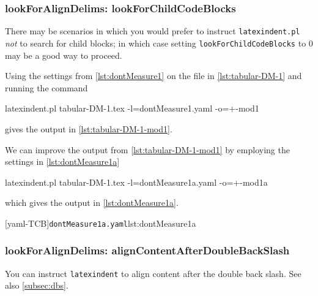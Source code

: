 \subsubsection{lookForAlignDelims: lookForChildCodeBlocks}\label{sec:lookForChildCodeBlocks}
 There  may be scenarios in
 which you would prefer to instruct \texttt{latexindent.pl} \emph{not} to search for
 child blocks; in which case setting \texttt{lookForChildCodeBlocks} to 0 may be a good
 way to proceed.

 \begin{example}
 Using the settings from \vref{lst:dontMeasure1} on the file in \cref{lst:tabular-DM-1}
 and running the command

 \begin{commandshell}
latexindent.pl tabular-DM-1.tex -l=dontMeasure1.yaml -o=+-mod1
\end{commandshell}

 gives the output in \cref{lst:tabular-DM-1-mod1}.
 \begin{cmhtcbraster}
 \end{cmhtcbraster}

 We can improve the output from \cref{lst:tabular-DM-1-mod1} by employing the settings in
 \cref{lst:dontMeasure1a}

 \begin{commandshell}
latexindent.pl tabular-DM-1.tex -l=dontMeasure1a.yaml -o=+-mod1a
\end{commandshell}

 which gives the output in \cref{lst:dontMeasure1a}.

 \begin{cmhtcbraster}
  [yaml-TCB]{\texttt{dontMeasure1a.yaml}}{lst:dontMeasure1a}
 \end{cmhtcbraster}
 \end{example}

\subsubsection{lookForAlignDelims: alignContentAfterDoubleBackSlash}\label{sec:alignContentAfterDoubleBackSlash}
 You can instruct \texttt{latexindent} to align  content after the double back slash. See also \vref{subsec:dbs}.

